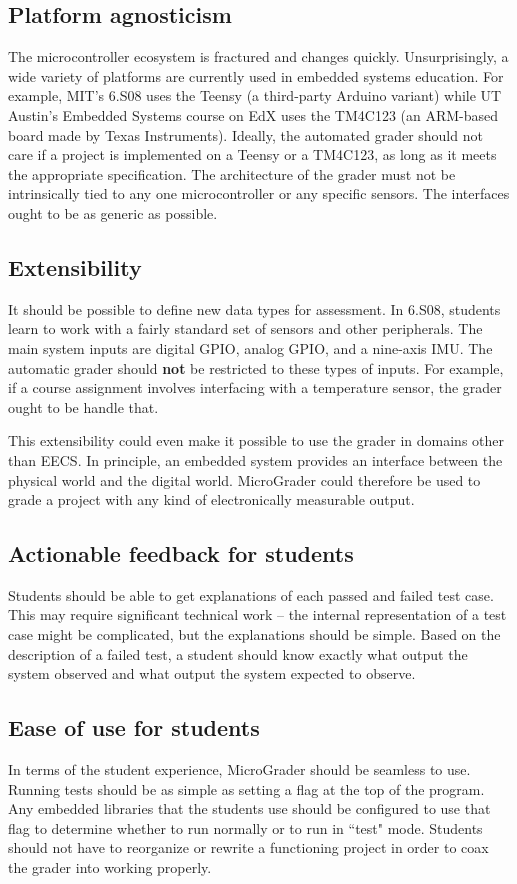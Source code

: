 \documentclass[12pt]{article}
\begin{document}
\subsection{Platform agnosticism}
The microcontroller ecosystem is fractured and changes quickly.  Unsurprisingly, a wide variety of platforms are currently used in embedded systems education.  For example, MIT's 6.S08 uses the Teensy (a third-party Arduino variant) while UT Austin's Embedded Systems course on EdX uses the TM4C123 (an ARM-based board made by Texas Instruments).  Ideally, the automated grader should not care if a project is implemented on a Teensy or a TM4C123, as long as it meets the appropriate specification. The architecture of the grader must not be intrinsically tied to any one microcontroller or any specific sensors.  The interfaces ought to be as generic as possible.

\subsection{Extensibility}
It should be possible to define new data types for assessment.  In 6.S08, students learn to work with a fairly standard set of sensors and other peripherals.  The main system inputs are digital GPIO, analog GPIO, and a nine-axis IMU.  The automatic grader should \textbf{not} be restricted to these types of inputs.  For example, if a course assignment involves interfacing with a temperature sensor, the grader ought to be handle that.

This extensibility could even make it possible to use the grader in domains other than EECS.  In principle, an embedded system provides an interface between the physical world and the digital world.  MicroGrader could therefore be used to grade a project with any kind of electronically measurable output.

\subsection{Actionable feedback for students}
Students should be able to get explanations of each passed and failed test case.  This may require significant technical work -- the internal representation of a test case might be complicated, but the explanations should be simple.  Based on the description of a failed test, a student should know exactly what output the system observed and what output the system expected to observe.

\subsection{Ease of use for students}
In terms of the student experience, MicroGrader should be seamless to use.  Running tests should be as simple as setting a flag at the top of the program.  Any embedded libraries that the students use should be configured to use that flag to determine whether to run normally or to run in ``test" mode.  Students should not have to reorganize or rewrite a functioning project in order to coax the grader into working properly.
\end{document}
